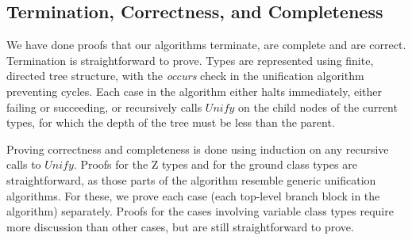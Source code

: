 \subsection{Termination, Correctness, and Completeness}

We have done proofs that our algorithms terminate, are complete
and are correct. Termination is straightforward to prove. Types are
represented using finite, directed tree structure, with the {\em
occurs} check in the unification algorithm preventing cycles. Each
case in the algorithm either halts immediately, either failing or
succeeding, or recursively calls $Unify$ on the child nodes of the
current types, for which the depth of the tree must be less than the
parent.

Proving correctness and completeness is done using induction on any
recursive calls to $Unify$.  Proofs for the Z types and for the ground
class types are straightforward, as those parts of the algorithm
resemble generic unification algorithms. For these, we prove each case
(each top-level branch block in the algorithm) separately. Proofs for
the cases involving variable class types require more discussion than
other cases, but are still straightforward to prove.
